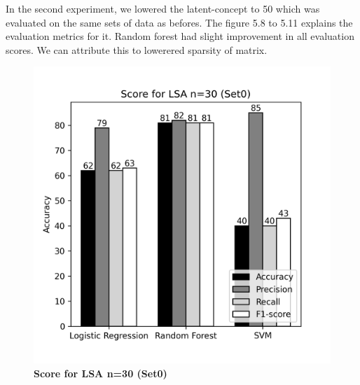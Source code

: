 \documentclass[12pt]{report}
\begin{document}
             In the second experiment, we lowered the latent-concept to 50 which was evaluated on the same sets of data as befores. The figure 5.8 to 5.11 explains the evaluation metrics for it. 
             Random forest had slight improvement in all evaluation scores. We can attribute this to lowerered sparsity of matrix.

             


             \begin{figure}[!htb]
                \begin{minipage}{0.48\textwidth}
                  \centering
                  \includegraphics[scale=0.55]{plots/Score for LSA n=30 (Set0).png}
                  \caption{\textbf{Score for LSA n=30 (Set0)}}\label{Fig:typo1}
                \end{minipage}\hfill
                \begin{minipage}{0.48\textwidth}
                  \centering

\end{minipage}
\end{figure}
\end{document}

